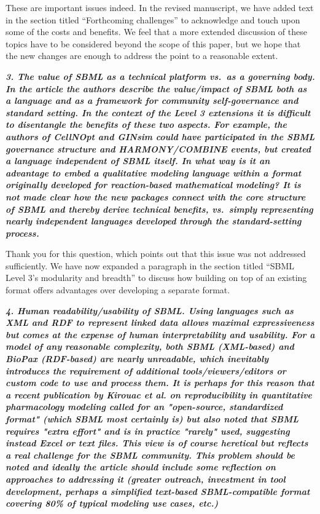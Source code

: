 \documentclass[11pt]{mhletter}
\begin{document}
These are important issues indeed.  In the revised manuscript, we have added text in the section titled ``Forthcoming challenges'' to acknowledge and touch upon some of the costs and benefits.  We feel that a more extended discussion of these topics have to be considered beyond the scope of this paper, but we hope that the new changes are enough to address the point to a reasonable extent.


\textbf{\textit{3. The value of SBML as a technical platform vs.\ as a governing body.  In the article the authors describe the value/impact of SBML both as a language and as a framework for community self-governance and standard setting. In the context of the Level 3 extensions it is difficult to disentangle the benefits of these two aspects. For example, the authors of CellNOpt and GINsim could have participated in the SBML governance structure and HARMONY/COMBINE events, but created a language independent of SBML itself. In what way is it an advantage to embed a qualitative modeling language within a format originally developed for reaction-based mathematical modeling? It is not made clear how the new packages connect with the core structure of SBML and thereby derive technical benefits, vs.\ simply representing nearly independent languages developed through the standard-setting process.}}

Thank you for this question, which points out that this issue was not addressed sufficiently.  We have now expanded a paragraph in the section titled ``SBML Level 3's modularity and breadth'' to discuss how building on top of an existing format offers advantages over developing a separate format.


\textbf{\textit{4. Human readability/usability of SBML. Using languages such as XML and RDF to represent linked data allows maximal expressiveness but comes at the expense of human interpretability and usability. For a model of any reasonable complexity, both SBML (XML-based) and BioPax (RDF-based) are nearly unreadable, which inevitably introduces the requirement of additional tools/viewers/editors or custom code to use and process them. It is perhaps for this reason that a recent publication by Kirouac et al. on reproducibility in quantitative pharmacology modeling  called for an "open-source, standardized format" (which SBML most certainly is) but also noted that SBML requires "extra effort" and is in practice "rarely" used, suggesting instead Excel or text files. This view is of course heretical but reflects a real challenge for the SBML community. This problem should be noted and ideally the article should include some reflection on approaches to addressing it (greater outreach, investment in tool development, perhaps a simplified text-based SBML-compatible format covering 80\% of typical modeling use cases, etc.)}}
\end{document}
